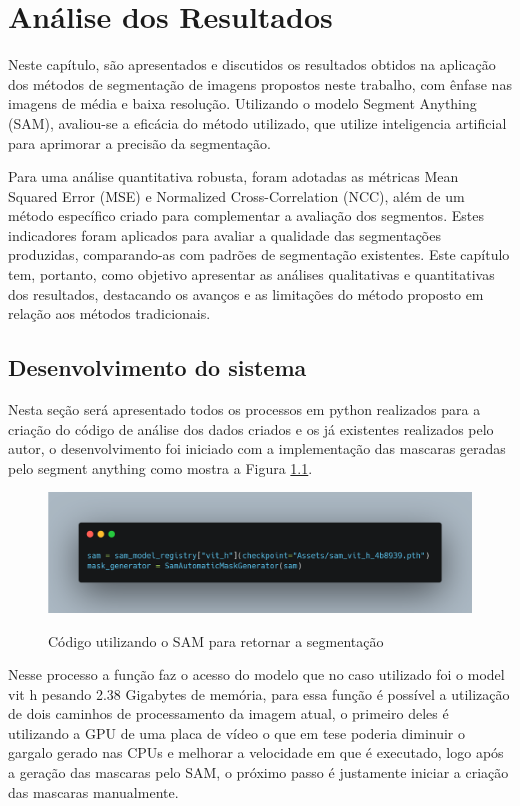 \chapter{Análise dos Resultados}
\label{cap:04}
Neste capítulo, são apresentados e discutidos os resultados obtidos na aplicação dos métodos de segmentação de imagens propostos neste trabalho, com ênfase nas imagens de média e baixa resolução. Utilizando o modelo Segment Anything (SAM), avaliou-se a eficácia do método utilizado, que utilize inteligencia artificial para aprimorar a precisão da segmentação.

Para uma análise quantitativa robusta, foram adotadas as métricas Mean Squared Error (MSE) e Normalized Cross-Correlation (NCC), além de um método específico criado para complementar a avaliação dos segmentos. Estes indicadores foram aplicados para avaliar a qualidade das segmentações produzidas, comparando-as com padrões de segmentação existentes. Este capítulo tem, portanto, como objetivo apresentar as análises qualitativas e quantitativas dos resultados, destacando os avanços e as limitações do método proposto em relação aos métodos tradicionais.

\section{Desenvolvimento do sistema}

Nesta seção será apresentado todos os processos em python realizados para a criação do código de análise dos dados criados e os já existentes realizados pelo autor, o desenvolvimento foi iniciado com a implementação das mascaras geradas pelo segment anything como mostra a Figura \ref{fig:code1}.

\FloatBarrier
\begin{figure}[ht]
    \caption{Código utilizando o SAM para retornar a segmentação}
    \centering
    \includegraphics[scale=0.25]{imagens/code_part_one.png}
    \label{fig:code1}
\end{figure}
\FloatBarrier

Nesse processo a função faz o acesso do modelo que no caso utilizado foi o model vit h pesando 2.38 Gigabytes de memória, para essa função é possível a utilização de dois caminhos de processamento da imagem atual, o primeiro deles é utilizando a GPU de uma placa de vídeo o que em tese poderia diminuir o gargalo gerado nas CPUs e melhorar a velocidade em que é executado, logo após a geração das mascaras pelo SAM, o próximo passo é justamente iniciar a criação das mascaras manualmente.


